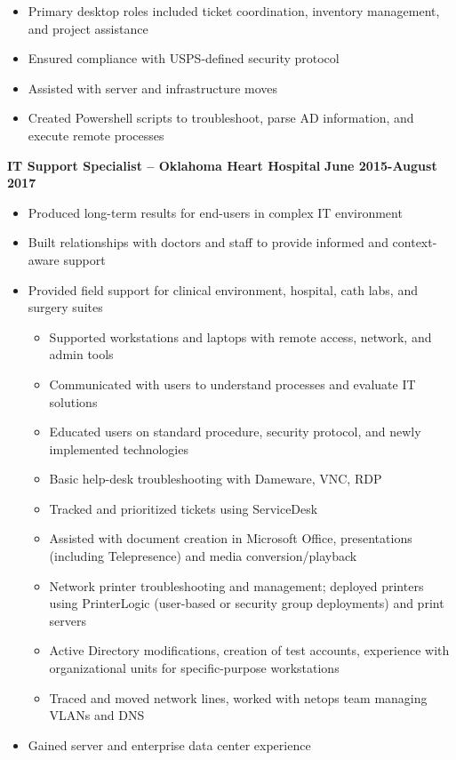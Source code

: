 \documentclass[line]{res}
\begin{document}
\begin{resume}
\begin{itemize}
		\item Primary desktop roles included ticket coordination, inventory management, and project assistance
		\item Ensured compliance with USPS-defined security protocol
		\item Assisted with server and infrastructure moves
		\item Created Powershell scripts to troubleshoot, parse AD information, and execute remote processes
	\end{itemize}
\textbf{IT Support Specialist -- Oklahoma Heart Hospital}
\newline
\textbf{June 2015-August 2017}
	\begin{itemize}
		\item Produced long-term results for end-users in complex IT environment
		\item Built relationships with doctors and staff to provide informed and context-aware support
		\item Provided field support for clinical environment, hospital, cath labs, and surgery suites
			\begin{itemize}
				\item Supported workstations and laptops with remote access, network, and admin tools
				\item Communicated with users to understand processes and evaluate IT solutions
				\item Educated users on standard procedure, security protocol, and newly implemented technologies
				\item Basic help-desk troubleshooting with Dameware, VNC, RDP
				\item Tracked and prioritized tickets using ServiceDesk
				\item Assisted with document creation in Microsoft Office, presentations (including Telepresence) and media conversion/playback
				\item Network printer troubleshooting and management; deployed printers using PrinterLogic (user-based or security group deployments) and print servers
				\item Active Directory modifications, creation of test accounts, experience with organizational units for specific-purpose workstations
				\item Traced and moved network lines, worked with netops team managing VLANs and DNS
			\end{itemize}		
		\item Gained server and enterprise data center experience

\end{itemize}
\end{resume}
\end{document}
